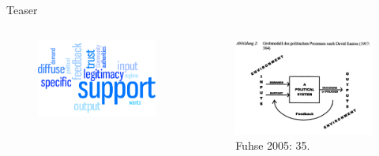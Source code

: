 \documentclass[11pt]{beamer}
\begin{document}
\begin{frame}{Teaser}
	\begin{columns}
		\begin{column}{0.5\textwidth}
			\begin{center}
				\begin{figure}[ht]
					\includegraphics[width=\textwidth]{pics/pre9.png}
				\end{figure}	
			\end{center}
		\end{column}
		\begin{column}{0.5\textwidth}
			\begin{center}
				\begin{figure}[ht]
					\includegraphics[width=\textwidth]{pics/pre10.png}
					\caption{Fuhse 2005: 35.}
				\end{figure}	
			\end{center}		
		\end{column}
				
	\end{columns}
\end{frame}
\end{document}
